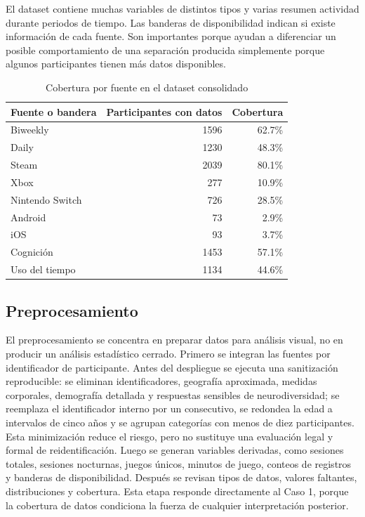 \documentclass[12pt,a4paper]{article}
\begin{document}
El dataset contiene muchas variables de distintos tipos y varias resumen actividad durante periodos de tiempo. Las banderas de disponibilidad indican si existe informaci\'on de cada fuente. Son importantes porque ayudan a diferenciar un posible comportamiento de una separaci\'on producida simplemente porque algunos participantes tienen m\'as datos disponibles.

\begin{table}[H]
\centering
\caption{Cobertura por fuente en el dataset consolidado}
\begin{tabular}{lrr}
\toprule
\textbf{Fuente o bandera} & \textbf{Participantes con datos} & \textbf{Cobertura} \\
\midrule
Biweekly & 1596 & 62.7\% \\
Daily & 1230 & 48.3\% \\
Steam & 2039 & 80.1\% \\
Xbox & 277 & 10.9\% \\
Nintendo Switch & 726 & 28.5\% \\
Android & 73 & 2.9\% \\
iOS & 93 & 3.7\% \\
Cognici\'on & 1453 & 57.1\% \\
Uso del tiempo & 1134 & 44.6\% \\
\bottomrule
\end{tabular}
\end{table}

\subsection{Preprocesamiento}

El preprocesamiento se concentra en preparar datos para an\'alisis visual, no en producir un an\'alisis estad\'istico cerrado. Primero se integran las fuentes por identificador de participante. Antes del despliegue se ejecuta una sanitizaci\'on reproducible: se eliminan identificadores, geograf\'ia aproximada, medidas corporales, demograf\'ia detallada y respuestas sensibles de neurodiversidad; se reemplaza el identificador interno por un consecutivo, se redondea la edad a intervalos de cinco a\~nos y se agrupan categor\'ias con menos de diez participantes. Esta minimizaci\'on reduce el riesgo, pero no sustituye una evaluaci\'on legal y formal de reidentificaci\'on. Luego se generan variables derivadas, como sesiones totales, sesiones nocturnas, juegos \'unicos, minutos de juego, conteos de registros y banderas de disponibilidad. Despu\'es se revisan tipos de datos, valores faltantes, distribuciones y cobertura. Esta etapa responde directamente al Caso 1, porque la cobertura de datos condiciona la fuerza de cualquier interpretaci\'on posterior.
\end{document}
